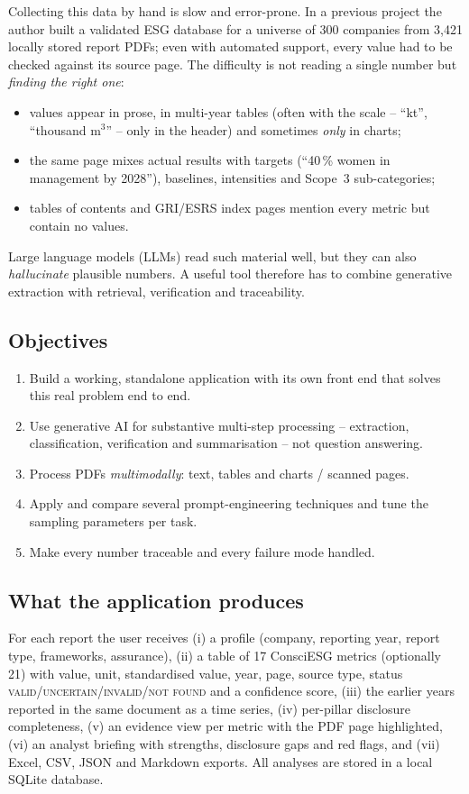 \documentclass[11pt,a4paper]{article}
\begin{document}
Collecting this data by hand is slow and error-prone. In a previous project the author built a validated
ESG database for a universe of 300 companies from 3{,}421 locally stored report PDFs; even with automated
support, every value had to be checked against its source page. The difficulty is not reading a single
number but \emph{finding the right one}:
\begin{itemize}
  \item values appear in prose, in multi-year tables (often with the scale -- ``kt'', ``thousand m$^3$'' -- only in the header)
        and sometimes \emph{only} in charts;
  \item the same page mixes actual results with targets (``40\,\% women in management by 2028''), baselines,
        intensities and Scope~3 sub-categories;
  \item tables of contents and GRI/ESRS index pages mention every metric but contain no values.
\end{itemize}
Large language models (LLMs) read such material well, but they can also \emph{hallucinate} plausible
numbers. A useful tool therefore has to combine generative extraction with retrieval, verification and
traceability.

\subsection{Objectives}
\begin{enumerate}
  \item Build a working, standalone application with its own front end that solves this real problem end to end.
  \item Use generative AI for substantive multi-step processing -- extraction, classification, verification and
        summarisation -- not question answering.
  \item Process PDFs \emph{multimodally}: text, tables and charts / scanned pages.
  \item Apply and compare several prompt-engineering techniques and tune the sampling parameters per task.
  \item Make every number traceable and every failure mode handled.
\end{enumerate}

\subsection{What the application produces}
For each report the user receives (i) a profile (company, reporting year, report type, frameworks,
assurance), (ii) a table of 17 ConsciESG metrics (optionally 21) with value, unit, standardised value,
year, page, source type, status \textsc{valid}/\textsc{uncertain}/\textsc{invalid}/\textsc{not found} and a
confidence score, (iii) the earlier years reported in the same document as a time series, (iv) per-pillar
disclosure completeness, (v) an evidence view per metric with the PDF page highlighted, (vi) an analyst
briefing with strengths, disclosure gaps and red flags, and (vii) Excel, CSV, JSON and Markdown exports.
All analyses are stored in a local SQLite database.
\end{document}
